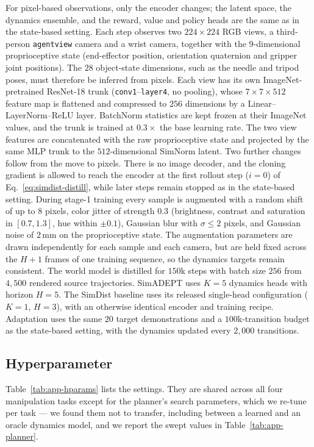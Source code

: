 \documentclass{article} %
\begin{document}
For pixel-based observations, only the encoder changes; the latent space, the dynamics ensemble, and the reward, value and policy heads are the same as in the state-based setting. Each step observes two $224\times224$ RGB views, a third-person \texttt{agentview} camera and a wrist camera, together with the $9$-dimensional proprioceptive state (end-effector position, orientation quaternion and gripper joint positions). The $28$ object-state dimensions, such as the needle and tripod poses, must therefore be inferred from pixels. Each view has its own ImageNet-pretrained ResNet-18 trunk (\texttt{conv1}--\texttt{layer4}, no pooling), whose $7\times7\times512$ feature map is flattened and compressed to $256$ dimensions by a Linear--LayerNorm--ReLU layer. BatchNorm statistics are kept frozen at their ImageNet values, and the trunk is trained at $0.3\times$ the base learning rate. The two view features are concatenated with the raw proprioceptive state and projected by the same MLP trunk to the $512$-dimensional SimNorm latent. Two further changes follow from the move to pixels. There is no image decoder, and the cloning gradient is allowed to reach the encoder at the first rollout step ($i=0$) of Eq.~\ref{eq:simdist-distill}, while later steps remain stopped as in the state-based setting. During stage-1 training every sample is augmented with a random shift of up to $8$ pixels, color jitter of strength $0.3$ (brightness, contrast and saturation in $[0.7,1.3]$, hue within $\pm0.1$), Gaussian blur with $\sigma\le2$ pixels, and Gaussian noise of $2$\,mm on the proprioceptive state. The augmentation parameters are drawn independently for each sample and each camera, but are held fixed across the $H{+}1$ frames of one training sequence, so the dynamics targets remain consistent. The world model is distilled for $150$k steps with batch size $256$ from $4{,}500$ rendered source trajectories. SimADEPT uses $K=5$ dynamics heads with horizon $H=5$. The SimDist baseline uses its released single-head configuration ($K=1$, $H=3$), with an otherwise identical encoder and training recipe. Adaptation uses the same $20$ target demonstrations and a $100$k-transition budget as the state-based setting, with the dynamics updated every $2{,}000$ transitions.

\subsection{Hyperparameter}

Table~\ref{tab:app-hparams} lists the settings. They are shared across all four
manipulation tasks except for the planner's search parameters, which we re-tune
per task --- we found them not to transfer, including between a learned and an
oracle dynamics model, and we report the swept values in
Table~\ref{tab:app-planner}.
\end{document}
